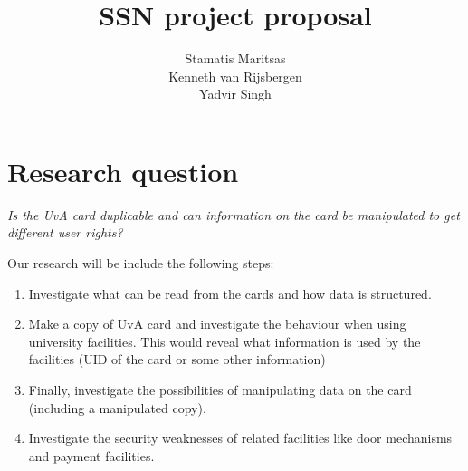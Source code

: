 \documentclass[11pt]{article}
\title{\textbf{SSN project proposal}}
\author{Stamatis Maritsas\\
		Kenneth van Rijsbergen\\
		Yadvir Singh}
\date{}
\begin{document}
\maketitle


\section{Research question}


\begin{framed}
\noindent \textit{Is the UvA card duplicable and can information on the card be manipulated to get different user rights?}
\end{framed}
Our research will be include the following steps:

\begin{enumerate}
\item{Investigate what can be read from the cards and how data is structured.}
\item{Make a copy of UvA card and investigate the behaviour when using university facilities. This would
reveal what information is used by the facilities (UID of the card or some other information)}
\item{Finally, investigate the possibilities of manipulating data on the card (including a manipulated copy).}
\item{Investigate the security weaknesses of related facilities like door mechanisms and payment facilities.}
\end{enumerate}

\clearpage
\end{document}
